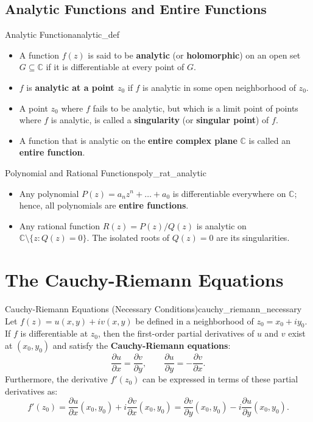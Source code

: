 \subsection{Analytic Functions and Entire Functions}

\begin{definition}{Analytic Function}{analytic_def}
\begin{itemize}
    \item A function $f(z)$ is said to be \textbf{analytic} (or \textbf{holomorphic}) on an open set $G \subseteq \mathbb{C}$ if it is differentiable at every point of $G$.
    \item $f$ is \textbf{analytic at a point $z_0$} if $f$ is analytic in some open neighborhood of $z_0$.
    \item A point $z_0$ where $f$ fails to be analytic, but which is a limit point of points where $f$ is analytic, is called a \textbf{singularity} (or \textbf{singular point}) of $f$.
    \item A function that is analytic on the \textbf{entire complex plane} $\mathbb{C}$ is called an \textbf{entire function}.
\end{itemize}
\end{definition}

\begin{example}{Polynomial and Rational Functions}{poly_rat_analytic}
\begin{itemize}
    \item Any polynomial $P(z) = a_n z^n + \dots + a_0$ is differentiable everywhere on $\mathbb{C}$; hence, all polynomials are \textbf{entire functions}.
    \item Any rational function $R(z) = P(z)/Q(z)$ is analytic on $\mathbb{C} \setminus \{z : Q(z) = 0\}$. The isolated roots of $Q(z) = 0$ are its singularities.
\end{itemize}
\end{example}


\section{The Cauchy-Riemann Equations}

\begin{theorem}{Cauchy-Riemann Equations (Necessary Conditions)}{cauchy_riemann_necessary}
Let $f(z) = u(x, y) + i v(x, y)$ be defined in a neighborhood of $z_0 = x_0 + i y_0$.
If $f$ is differentiable at $z_0$, then the first-order partial derivatives of $u$ and $v$ exist at $(x_0, y_0)$ and satisfy the \textbf{Cauchy-Riemann equations}:
\begin{equation}
\frac{\partial u}{\partial x} = \frac{\partial v}{\partial y}, \qquad \frac{\partial u}{\partial y} = -\frac{\partial v}{\partial x}.
\end{equation}
Furthermore, the derivative $f'(z_0)$ can be expressed in terms of these partial derivatives as:
\begin{equation}
f'(z_0) = \frac{\partial u}{\partial x}(x_0, y_0) + i \frac{\partial v}{\partial x}(x_0, y_0) = \frac{\partial v}{\partial y}(x_0, y_0) - i \frac{\partial u}{\partial y}(x_0, y_0).
\end{equation}
\end{theorem}

